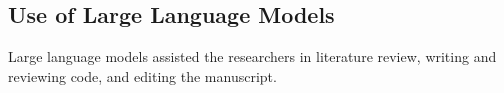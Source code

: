 \subsection{Use of Large Language Models}

Large language models assisted the researchers in literature review, writing
and reviewing code, and editing the manuscript.
